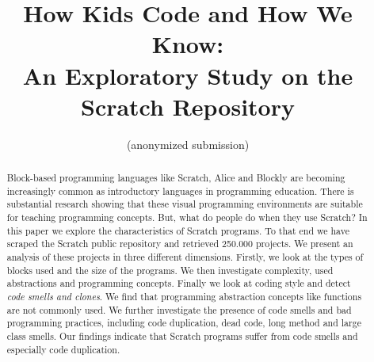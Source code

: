 \documentclass{sig-alternate}
\begin{document}
%

\title{How Kids Code and How We Know:\\An Exploratory Study on the Scratch Repository }

\author{
\alignauthor
(anonymized submission)
}


\maketitle
\begin{abstract}
Block-based programming languages like Scratch, Alice and Blockly are becoming increasingly common as introductory languages in programming education. There is substantial research showing that these visual programming environments are suitable for teaching programming concepts. But, what do people do when they use Scratch? In this paper we explore the characteristics of Scratch programs. To that end we have scraped the Scratch public repository and retrieved 250.000 projects. We present an analysis of these projects in three different dimensions. Firstly, we look at the types of blocks used and the size of the programs. We then investigate complexity, used abstractions and programming concepts. Finally we look at coding style and detect \emph{code smells and clones}. We find that programming abstraction concepts like functions are not commonly used. We further investigate the presence of code smells and bad programming practices, including code duplication, dead code, long method and large class smells. Our findings indicate that Scratch programs suffer from code smells and especially code duplication.
\end{abstract}
\end{document}
